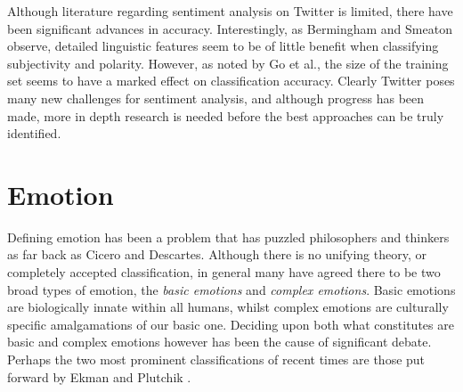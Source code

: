 Although literature regarding sentiment analysis on Twitter is limited, there have been significant advances in accuracy. Interestingly, as Bermingham and Smeaton observe, detailed linguistic features seem to be of little benefit when classifying subjectivity and polarity. However, as noted by Go et al., the size of the training set seems to have a marked effect on classification accuracy. Clearly Twitter poses many new challenges for sentiment analysis, and although progress has been made, more in depth research is needed before the best approaches can be truly identified.

\begin{comment}

Understanding sentiment on Twitter however, requires slight changes to our approach. We will assume that opinion expressed within a tweet is the user's own, and that the time at which a tweet is posted reflects the time at which any opinion in it was cast. This leaves us with three core problems. First we must determine whether a tweet contains an opinion, and if so, we must be able to both classify it and determine its topic. Research into Twitter-targeted sentiment analysis is limited, however, due to the length constraints placed upon tweets, aspects of sentence-level classification still bare relevance. Furthemore work such as Bermingham' \cite{Bermingham:2010vh} and Barbosa's \cite{Barbosa:ws} highlight some key variations in approach to sentiment analysis on Twitter.

\cite{Barbosa:ws} - suggests 2-step framework, subjectivity detetction then classification
\cite{Barbosa:ws} - additional features from tweet syntax

Robust sentiment detection \cite{Barbosa:ws}
	- good overview

Identifying themes/sentiment \cite{KumarPal:2010fd}
- good topic extraction

Is brevity an advantage? \cite{Bermingham:2010vh}

Sentiment in twitter events \cite{Thelwall:to}

Distant supervision \cite{Go:2009ut}

\end{comment}

\section{Emotion}
\label{background:emotion}

Defining emotion has been a problem that has puzzled philosophers and thinkers as far back as Cicero and Descartes. Although there is no unifying theory, or completely accepted classification, in general many have agreed there to be two broad types of emotion, the \emph{basic emotions} and \emph{complex emotions}. Basic emotions are biologically innate within all humans, whilst complex emotions are culturally specific amalgamations of our basic one. Deciding upon both what constitutes are basic and complex emotions however has been the cause of significant debate. Perhaps the two most prominent classifications of recent times are those put forward by Ekman \cite{Ekman:1969ux} and Plutchik \cite{Plutchik:2001tp}. 

